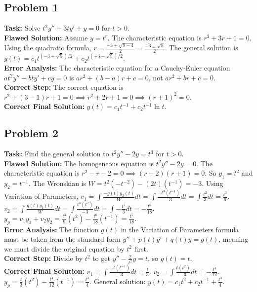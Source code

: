 \documentclass{article}
\begin{document}
\subsection{Problem 1}
\textbf{Task:} Solve $t^2 y'' + 3ty' + y = 0$ for $t > 0$. \\
\textbf{Flawed Solution:}
Assume $y = t^r$. The characteristic equation is $r^2 + 3r + 1 = 0$.
Using the quadratic formula, $r = \frac{-3 \pm \sqrt{9 - 4}}{2} = \frac{-3 \pm \sqrt{5}}{2}$.
The general solution is $y(t) = c_1 t^{(-3+\sqrt{5})/2} + c_2 t^{(-3-\sqrt{5})/2}$. \\
\textbf{Error Analysis:} The characteristic equation for a Cauchy-Euler equation $at^2 y'' + bty' + cy = 0$ is $ar^2 + (b-a)r + c = 0$, not $ar^2 + br + c = 0$. \\
\textbf{Correct Step:} The correct equation is $r^2 + (3-1)r + 1 = 0 \implies r^2 + 2r + 1 = 0 \implies (r+1)^2 = 0$. \\
\textbf{Correct Final Solution:} $y(t) = c_1 t^{-1} + c_2 t^{-1} \ln t$.

\subsection{Problem 2}
\textbf{Task:} Find the general solution to $t^2 y'' - 2y = t^3$ for $t > 0$. \\
\textbf{Flawed Solution:}
The homogeneous equation is $t^2 y'' - 2y = 0$. The characteristic equation is $r^2 - r - 2 = 0 \implies (r-2)(r+1) = 0$.
So $y_1 = t^2$ and $y_2 = t^{-1}$. The Wronskian is $W = t^2(-t^{-2}) - (2t)(t^{-1}) = -3$.
Using Variation of Parameters, $v_1 = \int \frac{-g(t)y_2(t)}{W} dt = \int \frac{-t^3(t^{-1})}{-3} dt = \int \frac{t^2}{3} dt = \frac{t^3}{9}$.
$v_2 = \int \frac{g(t)y_1(t)}{W} dt = \int \frac{t^3(t^2)}{-3} dt = \int -\frac{t^5}{3} dt = -\frac{t^6}{18}$.
$y_p = v_1 y_1 + v_2 y_2 = \frac{t^3}{9}(t^2) - \frac{t^6}{18}(t^{-1}) = \frac{t^5}{18}$. \\
\textbf{Error Analysis:} The function $g(t)$ in the Variation of Parameters formula must be taken from the standard form $y'' + p(t)y' + q(t)y = g(t)$, meaning we must divide the original equation by $t^2$ first. \\
\textbf{Correct Step:} Divide by $t^2$ to get $y'' - \frac{2}{t^2}y = t$, so $g(t) = t$. \\
\textbf{Correct Final Solution:} $v_1 = \int \frac{-t(t^{-1})}{-3} dt = \frac{t}{3}$. $v_2 = \int \frac{t(t^2)}{-3} dt = -\frac{t^4}{12}$. $y_p = \frac{t}{3}(t^2) - \frac{t^4}{12}(t^{-1}) = \frac{t^3}{4}$. General solution: $y(t) = c_1 t^2 + c_2 t^{-1} + \frac{t^3}{4}$.
\end{document}
